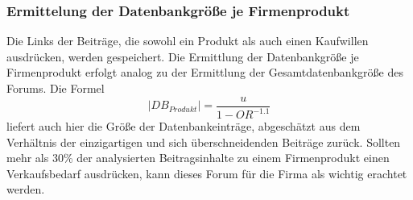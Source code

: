 \subsubsection{Ermittelung der Datenbankgröße je Firmenprodukt}
Die Links der Beiträge, die sowohl ein Produkt als auch einen Kaufwillen ausdrücken, werden gespeichert. Die Ermittlung der Datenbankgröße je Firmenprodukt erfolgt analog zu der Ermittlung der Gesamtdatenbankgröße des Forums. Die Formel \[|DB_{Produkt}| = \frac{u}{1-OR^{-1.1}}\] \cite{lu2008efficient} liefert auch hier die Größe der Datenbankeinträge, abgeschätzt aus dem Verhältnis der einzigartigen und sich überschneidenden Beiträge zurück.
Sollten mehr als 30\% der analysierten Beitragsinhalte zu einem Firmenprodukt einen Verkaufsbedarf ausdrücken, kann dieses Forum für die Firma als wichtig erachtet werden.

